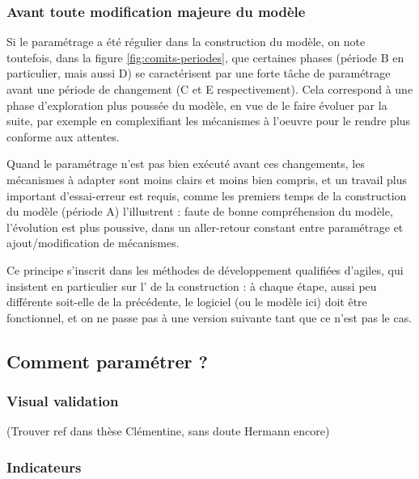 \documentclass[12pt, a4paper, oneside]{book}
\begin{document}
\subsubsection{Avant toute modification majeure du modèle}

Si le paramétrage a été régulier dans la construction du modèle, on note toutefois, dans la figure \ref{fig:comits-periodes}, que certaines phases (période B en particulier, mais aussi D) se caractérisent par une forte tâche de paramétrage avant une période de changement (C et E respectivement).
Cela correspond à une phase d'exploration plus poussée du modèle, en vue de le faire évoluer par la suite, par exemple en complexifiant les mécanismes à l'oeuvre pour le rendre plus conforme aux attentes.

Quand le paramétrage n'est pas bien exécuté avant ces changements, les mécanismes à adapter sont moins clairs et moins bien compris, et un travail plus important d'essai-erreur est requis, comme les premiers temps de la construction du modèle (période A) l'illustrent : faute de bonne compréhension du modèle, l'évolution est plus poussive, dans un aller-retour constant entre paramétrage et ajout/modification de mécanismes.

Ce principe s'inscrit dans les méthodes de développement qualifiées d'\og agiles\fg{}, qui insistent en particulier sur l' de la construction : à chaque étape, aussi peu différente soit-elle de la précédente, le logiciel (ou le modèle ici) doit être fonctionnel, et on ne passe pas à une version suivante tant que ce n'est pas le cas.

\subsection{Comment paramétrer ?}


\subsubsection{Visual validation}

(Trouver ref dans thèse Clémentine, sans doute Hermann encore)

\subsubsection{Indicateurs}
\end{document}
